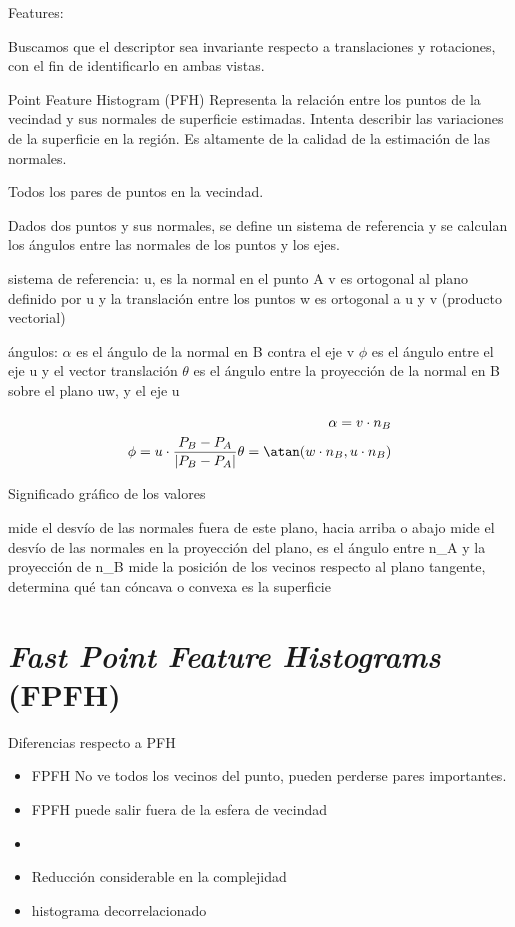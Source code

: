 Features:

Buscamos que el descriptor sea invariante respecto a translaciones y rotaciones,
con el fin de identificarlo en ambas vistas.

Point Feature Histogram (PFH)
Representa la relación entre los puntos de la vecindad y sus normales de superficie estimadas.
Intenta describir las variaciones de la superficie en la región.
Es altamente de la calidad de la estimación de las normales.

Todos los pares de puntos en la vecindad.

Dados dos puntos y sus normales, se define un sistema de referencia
y se calculan los ángulos entre las normales de los puntos y los ejes.

sistema de referencia:
u, es la normal en el punto A
v es ortogonal al plano definido por u y la translación entre los puntos
w es ortogonal a u y v (producto vectorial)

ángulos:
$\alpha$ es el ángulo de la normal en B contra el eje v
$\phi$ es el ángulo entre el eje u y el vector translación
$\theta$ es el ángulo entre la proyección de la normal en B sobre el plano uw, y el eje u

\begin{eqnarray}
	\alpha = v \cdot n_B \\
	\phi = u \cdot \frac{P_B - P_A}{|P_B - P_A|}
	\theta = \atan(w \cdot n_B, u \cdot n_B)
\end{eqnarray}

Significado gráfico de los valores


\alpha mide el desvío de las normales fuera de este plano, hacia arriba o abajo
\theta mide el desvío de las normales en la proyección del plano, es el ángulo entre n_A y la proyección de n_B
\phi mide la posición de los vecinos respecto al plano tangente, determina qué tan cóncava o convexa es la superficie



\section{\emph{Fast Point Feature Histograms} (FPFH)}
Diferencias respecto a PFH
\begin{itemize}
	\item FPFH No ve todos los vecinos del punto, pueden perderse pares importantes.
	\item FPFH puede salir fuera de la esfera de vecindad
	\item {}
	\item Reducción considerable en la complejidad
	\item histograma decorrelacionado
\end{itemize}

